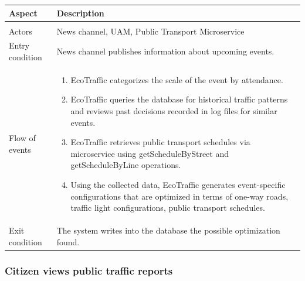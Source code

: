\documentclass[12pt, a4paper, twoside, openright]{report}
\begin{document}
\begin{longtable}{>{\raggedright\arraybackslash}p{} >{\raggedright\arraybackslash}p{}}
\toprule
\textbf{Aspect} & \textbf{Description} \\
\midrule
\endhead
\midrule
\multicolumn{2}{r}{\textit{Continues on next page}} \\
\endfoot
\bottomrule
\endlastfoot

Actors & News channel, UAM, Public Transport Microservice \\
Entry condition & News channel publishes information about upcoming events. \\
Flow of events &
\begin{enumerate}
  \item EcoTraffic categorizes the scale of the event by attendance.
  \item EcoTraffic queries the database for historical traffic patterns and reviews past decisions recorded in log files for similar events.
  \item EcoTraffic retrieves public transport schedules via microservice using getScheduleByStreet and getScheduleByLine operations.
  \item Using the collected data, EcoTraffic generates event-specific configurations that are optimized in terms of one-way roads, traffic light configurations, public transport schedules.
\end{enumerate}
\\
Exit condition & The system writes into the database the possible optimization found. \\
\end{longtable}

\subsubsection{Citizen views public traffic reports}
\end{document}
